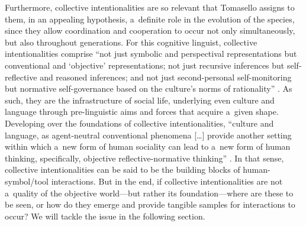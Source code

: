 Furthermore, collective intentionalities are so relevant that Tomasello
\parencite*[][]{tomasello_natural_2014} %
 assigns to them, in an appealing hypothesis, a~definite role in the evolution of the species, since they allow coordination and cooperation to occur not only simultaneously, but also throughout generations. For this cognitive linguist, collective intentionalities comprise ``not just symbolic and perspectival representations but conventional and ‘objective' representations; not just recursive inferences but self-reflective and reasoned inferences; and not just second-personal self-monitoring but normative self-governance based on the culture's norms of rationality'' 
\parencite[][p.6]{tomasello_natural_2014}. %
 As such, they are the infrastructure of social life, underlying even culture and language through pre-linguistic aims and forces that acquire a~given shape. Developing over the foundations of collective intentionalities, ``culture and language, as agent-neutral conventional phenomena […] provide another setting within which a~new form of human sociality can lead to a~new form of human thinking, specifically, objective reflective-normative thinking'' 
\parencite[][p.141]{tomasello_natural_2014}. %
 In that sense, collective intentionalities can be said to be the building blocks of human-symbol/tool interactions. But in the end, if collective intentionalities are not a~quality of the objective world—but rather its foundation—where are these to be seen, or how do they emerge and provide tangible samples for interactions to occur? We will tackle the issue in the following section.

